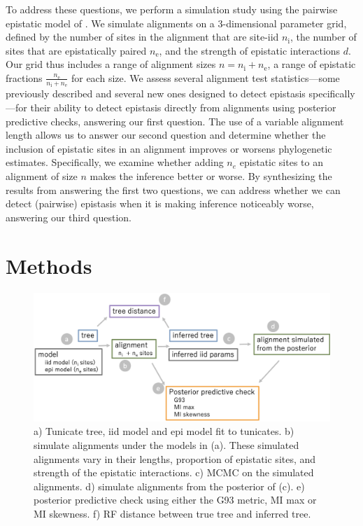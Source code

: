 \documentclass[11pt]{article}
\begin{document}
To address these questions, we perform a simulation study using the pairwise epistatic model of \cite{nasrallah2013phylogenetic}.
We simulate alignments on a 3-dimensional parameter grid, defined by the number of sites in the alignment that are site-iid $n_{\mathrm{i}}$, the number of sites that are epistatically paired $n_{\mathrm{e}}$, and the strength of epistatic interactions $d$.
Our grid thus includes a range of alignment sizes $n = n_{\mathrm{i}}+n_{\mathrm{e}}$, a range of epistatic fractions $\frac{n_{\mathrm{e}}}{n_{\mathrm{i}}+n_{\mathrm{e}}}$ for each size.
We assess several alignment test statistics---some previously described and several new ones designed to detect epistasis specifically---for their ability to detect epistasis directly from alignments using posterior predictive checks, answering our first question.
The use of a variable alignment length allows us to answer our second question and determine whether the inclusion of epistatic sites in an alignment improves or worsens phylogenetic estimates.
Specifically, we examine whether adding $n_e$ epistatic sites to an alignment of size $n$ makes the inference better or worse.
By synthesizing the results from answering the first two questions, we can address whether we can detect (pairwise) epistasis when it is making inference noticeably worse, answering our third question.

\section*{Methods\label{sec:methods}}

\begin{figure}
  \centering
  \includegraphics[width=\textwidth]{figures/schematic.png}
  \caption{
a) Tunicate tree, iid model and epi model fit to tunicates. b) simulate alignments under the models in (a). These simulated alignments vary in their lengths, proportion of epistatic sites, and strength of the epistatic interactions. c) MCMC on the simulated alignments. d) simulate alignments from the posterior of (c). e) posterior predictive check using either the G93 metric, MI max or MI skewness. f) RF distance between true tree and inferred tree.
  }
  \label{fig:schematic}
\end{figure}
\end{document}
